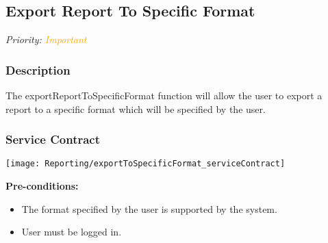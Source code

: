 \subsection{Export Report To Specific Format}
\textit{Priority: \textcolor{orange}{Important}}

\subsubsection{Description}
The exportReportToSpecificFormat function will allow the user to export a report to a specific format which will be specified by the user.


\subsubsection{Service Contract}
\texttt{[image: Reporting/exportToSpecificFormat\_serviceContract]}

	\textbf{Pre-conditions:}
	\begin{itemize}
		\item The format specified by the user is supported by the system.
		\item User must be logged in.
	\end{itemize}
